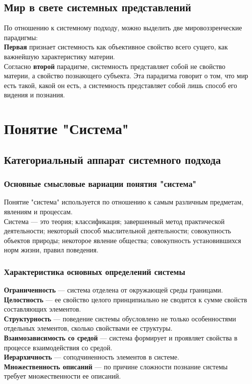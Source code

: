 \documentclass{article}
\newcommand{\important}[1]{\textbf{#1}}
\begin{document}
\subsection{Мир в свете системных представлений}
По отношению к системному подходу, можно выделить две мировоззренческие парадигмы:
\\
\important{Первая} признает системность как объективное свойство всего сущего, как важнейшую характеристику материи.
\\
Согласно \important{второй} парадигме, системность представляет собой не свойство материи, а свойство познающего субъекта. Эта парадигма говорит о том, что мир есть такой, какой он есть, а системность представляет собой лишь способ его видения и познания.
\section{Понятие "Система"}
\subsection{Категориальный аппарат системного подхода}
\subsubsection*{Основные смысловые вариации понятия "система"}
Понятие "система" используется по отношению к самым различным предметам, явлениям и процессам.
\\
Система --- это теория; классификация; завершенный метод практической деятельности; некоторый способ мыслительной деятельности; совокупность объектов природы; некоторое явление общества; совокупность установившихся норм жизни, правил поведения.
\subsubsection*{Характеристика основных определений системы}
\important{Ограниченность} --- система отделена от окружающей среды границами.
\\
\important{Целостность} --- ее свойство целого принципиально не сводится к сумме свойств составляющих элементов.
\\
\important{Структурность} --- поведение системы обусловлено не только особенностями отдельных элементов, сколько свойствами ее структуры.
\\
\important{Взаимозависимость со средой} --- система формирует и проявляет свойства в процессе взаимодействия со средой.
\\
\important{Иерархичность} --- соподчиненность элементов в системе.
\\
\important{Множественность описаний} --- по причине сложности познание системы требует множественности ее описаний.
\end{document}
